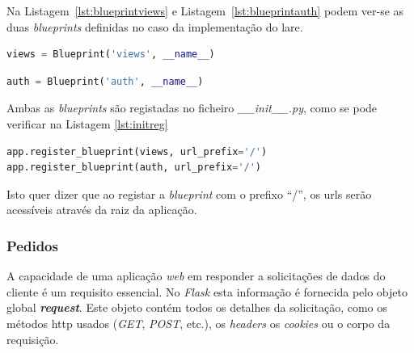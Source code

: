 Na Listagem~\ref{lst:blueprintviews} e Listagem~\ref{lst:blueprintauth} podem ver-se as duas \textit{blueprints} definidas no caso da implementação do \acrshort{lare}.
\begin{center}
	\begin{minipage}{0.7\linewidth}
		\begin{lstlisting}[language=Python, caption=\textit{Blueprint views} - \textit{views.py}, label=lst:blueprintviews]
views = Blueprint('views', __name__)
\end{lstlisting}
	\end{minipage}
\end{center}

\begin{center}
	\begin{minipage}{0.7\linewidth}
		\begin{lstlisting}[language=Python, caption=\textit{Blueprint auth} - \textit{auth.py}, label=lst:blueprintauth]
auth = Blueprint('auth', __name__)
\end{lstlisting}
	\end{minipage}
\end{center}

Ambas as \textit{blueprints} são registadas no ficheiro \textit{\_\_init\_\_.py}, como se pode verificar na Listagem \ref{lst:initreg}

\begin{center}
	\begin{minipage}{0.7\linewidth}
		\begin{lstlisting}[language=Python, caption=Registo das \textit{blueprints} - \textit{\_\_init\_\_.py}, label=lst:initreg]
app.register_blueprint(views, url_prefix='/')
app.register_blueprint(auth, url_prefix='/')
\end{lstlisting}
	\end{minipage}
\end{center}

Isto quer dizer que ao registar a \textit{blueprint} com o prefixo ``/'', os \acrshort{url}s serão acessíveis através da raiz da aplicação.

\subsubsection{Pedidos}
A capacidade de uma aplicação \textit{web} em responder a solicitações de dados do cliente é um requisito essencial. No \textit{Flask} esta informação é fornecida pelo objeto global \textit{\textbf{request}}. Este objeto contém todos os detalhes da solicitação, como os métodos \acrshort{http} usados (\textit{GET}, \textit{POST}, etc.), os \textit{headers} os \textit{cookies} ou o corpo da requisição.

